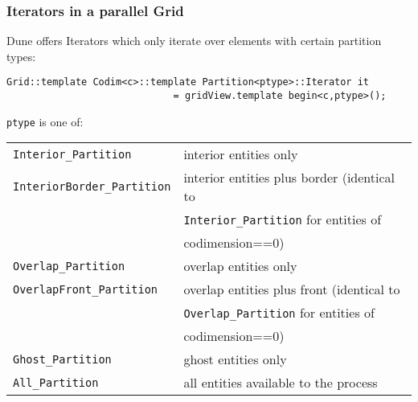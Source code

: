 \begin{frame}[fragile]
  \frametitle<presentation>{Iterators in a parallel Grid}
  \small
  Dune offers Iterators which only iterate over elements with certain partition types:\\
\begin{lstlisting}
Grid::template Codim<c>::template Partition<ptype>::Iterator it
                             = gridView.template begin<c,ptype>();
\end{lstlisting}

\lstinline!ptype! is one of:
  \begin{center}
    \begin{tabular}{ll}
      \texttt{Interior\_Partition} & interior entities only\\
      \texttt{InteriorBorder\_Partition} & interior entities plus border (identical to \\
                                         & \texttt{Interior\_Partition} for entities of \\
                                         & codimension==0)\\
      \texttt{Overlap\_Partition} & overlap entities only\\
      \texttt{OverlapFront\_Partition} & overlap entities plus front (identical to \\
                                       & \texttt{Overlap\_Partition} for entities of \\
                                       & codimension==0)\\
      \texttt{Ghost\_Partition} & ghost entities only\\
      \texttt{All\_Partition} & all entities available to the process
    \end{tabular}
  \end{center}
\end{frame}

